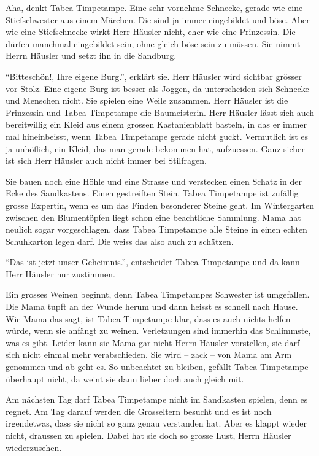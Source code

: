 Aha, denkt Tabea Timpetampe. Eine sehr vornehme Schnecke, gerade wie eine Stiefschwester aus einem Märchen. Die sind ja immer eingebildet und böse. Aber wie eine Stiefschnecke wirkt Herr Häusler nicht, eher wie eine Prinzessin. Die dürfen manchmal eingebildet sein, ohne gleich böse sein zu müssen. Sie nimmt Herrn Häusler und setzt ihn in die Sandburg.

\enquote{Bitteschön!, Ihre eigene Burg.}, erklärt sie. Herr Häusler wird sichtbar grösser vor Stolz. Eine eigene Burg ist besser als Joggen, da unterscheiden sich Schnecke und Menschen nicht. Sie spielen eine Weile zusammen. Herr Häusler ist die Prinzessin und Tabea Timpetampe die Baumeisterin. Herr Häusler lässt sich auch bereitwillig ein Kleid aus einem grossen Kastanienblatt basteln, in das er immer mal hineinbeisst, wenn Tabea Timpetampe gerade nicht guckt. Vermutlich ist es ja unhöflich, ein Kleid, das man gerade bekommen hat, aufzuessen. Ganz sicher ist sich Herr Häusler auch nicht immer bei Stilfragen.

Sie bauen noch eine Höhle und eine Strasse und verstecken einen Schatz in der Ecke des Sandkastens. Einen gestreiften Stein. Tabea Timpetampe ist zufällig grosse Expertin, wenn es um das Finden besonderer Steine geht. Im Wintergarten zwischen den Blumentöpfen liegt schon eine beachtliche Sammlung. Mama hat neulich sogar vorgeschlagen, dass Tabea Timpetampe alle Steine in einen echten Schuhkarton legen darf. Die weiss das also auch zu schätzen.

\enquote{Das ist jetzt unser Geheimnis.}, entscheidet Tabea Timpetampe und da kann Herr Häusler nur zustimmen. 

Ein grosses Weinen beginnt, denn Tabea Timpetampes Schwester ist umgefallen. Die Mama tupft an der Wunde herum und dann heisst es schnell nach Hause. Wie Mama das sagt, ist Tabea Timpetampe klar, dass es auch nichts helfen würde, wenn sie anfängt zu weinen. Verletzungen sind immerhin das Schlimmste, was es gibt. Leider kann sie Mama gar nicht Herrn Häusler vorstellen, sie darf sich nicht einmal mehr verabschieden. Sie wird -- zack -- von Mama am Arm genommen und ab geht es. So unbeachtet zu bleiben, gefällt Tabea Timpetampe überhaupt nicht, da weint sie dann lieber doch auch gleich mit.

Am nächsten Tag darf Tabea Timpetampe nicht im Sandkasten spielen, denn es regnet. Am Tag darauf werden die Grosseltern besucht und es ist noch irgendetwas, dass sie nicht so ganz genau verstanden hat. Aber es klappt wieder nicht, draussen zu spielen. Dabei hat sie doch so grosse Lust, Herrn Häusler wiederzusehen. 

